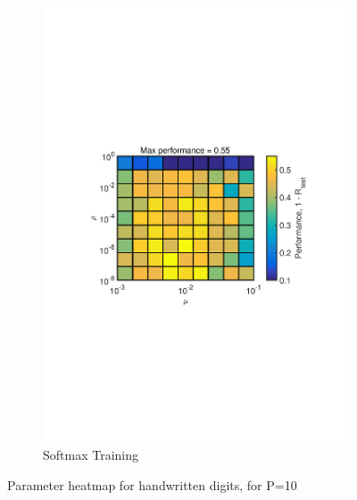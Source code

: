 \documentclass[journal,a4paper,onecolumn,11pt]{IEEEtran}
\begin{document}
\begin{figure}[!h]
\begin{subfigure}{.5\textwidth}
		\includegraphics[width=\textwidth]{para_opt_digit_sm.pdf}
		\caption{Softmax Training}
		\label{fig:para_opt_digit_sm}
	\end{subfigure}%
	\caption{Parameter heatmap for handwritten digits, for P=10}
	\label{fig:heatmap_handwrittendigit}
\end{figure}
\end{document}
